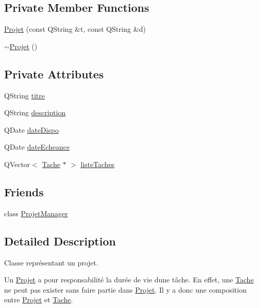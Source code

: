 \subsection*{Private Member Functions}
\begin{DoxyCompactItemize}
\item 
\hyperlink{class_projet_a0149f821f689f5910c7c6d0278d3dd4b}{Projet} (const Q\+String \&t, const Q\+String \&d)
\item 
\hyperlink{class_projet_a26e3e136385eca01dda79df7fba4e03d}{$\sim$\+Projet} ()
\end{DoxyCompactItemize}
\subsection*{Private Attributes}
\begin{DoxyCompactItemize}
\item 
Q\+String \hyperlink{class_projet_a9759849c856c2ac63f94751b876fd289}{titre}
\item 
Q\+String \hyperlink{class_projet_ac2e3a37d5f0201390991b97f258ce0eb}{description}
\item 
Q\+Date \hyperlink{class_projet_a8a89803d629bb571062921008e6a2639}{date\+Dispo}
\item 
Q\+Date \hyperlink{class_projet_a868ee370bb8f071b830dda61f55d99cd}{date\+Echeance}
\item 
Q\+Vector$<$ \hyperlink{class_tache}{Tache} $\ast$ $>$ \hyperlink{class_projet_a268bc6fc9be6d5e266439cc6371cd617}{liste\+Taches}
\end{DoxyCompactItemize}
\subsection*{Friends}
\begin{DoxyCompactItemize}
\item 
class \hyperlink{class_projet_aaaed9857b3481233fa7c581b5c86151d}{Projet\+Manager}
\end{DoxyCompactItemize}


\subsection{Detailed Description}
Classe représentant un projet. 

Un \hyperlink{class_projet}{Projet} a pour responsabilité la durée de vie d\textquotesingle{}une tâche. En effet, une \hyperlink{class_tache}{Tache} ne peut pas exister sans faire partie dans \hyperlink{class_projet}{Projet}. Il y a donc une composition entre \hyperlink{class_projet}{Projet} et \hyperlink{class_tache}{Tache}. 

